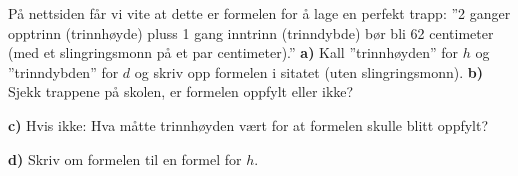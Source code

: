 \nes
{}
På nettsiden  får vi vite at dette er formelen for å lage en perfekt trapp:\os
''2 ganger opptrinn (trinnhøyde) pluss 1 gang inntrinn (trinndybde) bør bli 62 centimeter (med et slingringsmonn på et par centimeter).'' \os
\textbf{a)} Kall ''trinnhøyden'' for $ h $ og ''trinndybden'' for $ d $ og skriv opp formelen i sitatet (uten slingringsmonn).\os
\textbf{b)} Sjekk trappene på skolen, er formelen oppfylt eller ikke?\os

\textbf{c)} Hvis ikke: Hva måtte trinnhøyden vært for at formelen skulle blitt oppfylt?\os

\textbf{d)} Skriv om formelen til en formel for $ h $.

